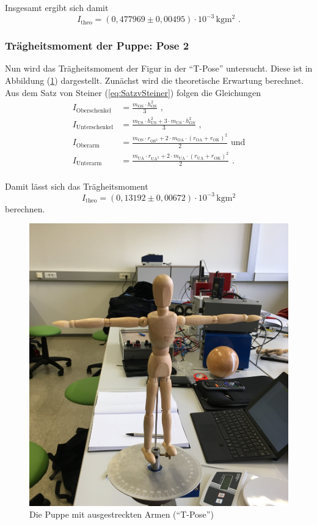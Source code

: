 Insgesamt ergibt sich damit
\begin{equation*}
  I_{\text{theo}} = (0,477969 \pm 0,00495) \cdot 10^{-3} \, \unit{\kilo\gram\meter\squared} \text{ .}
\end{equation*}

\subsubsection{Trägheitsmoment der Puppe: Pose 2}

Nun wird das Trägheitsmoment der Figur in der \enquote{T-Pose} untersucht.
Diese ist in Abbildung (\ref{fig:pose2}) dargestellt.
Zunächst wird die theoretische Erwartung berechnet.
Aus dem Satz von Steiner (\ref{eq:SatzvSteiner}) folgen die Gleichungen
\begin{align*}
I_{\text{Oberschenkel}} &= \frac{m_{\text{OS}} \cdot h_{\text{OS}}^2} {3} \text{ ,}\\
I_{\text{Unterschenkel}} &= \frac{m_{\text{US}} \cdot h_{\text{US}}^2 + 3 \cdot m_{US} \cdot h_{OS}^2} {3} \text{ ,}\\
I_{\text{Oberarm}} &= \frac{m_{\text{OS}} \cdot r_{\text{OS}^2} + 2 \cdot m_{\text{OA}} \cdot (r_{\text{OA}} + r_{\text{OK}})^2} {2} \text{ und}\\
I_{\text{Unterarm}} &= \frac{m_{\text{UA}} \cdot r_{\text{UA}^2} + 2 \cdot m_{\text{UA}} \cdot (r_{\text{UA}} + r_{\text{OK}})^2} {2} \text{ .}\\
\end{align*}

Damit lässt sich das Trägheitsmoment
\begin{equation*}
  I_{\text{theo}} = (0,13192 \pm 0,00672) \cdot 10^{-3} \, \unit{\kilo\gram\meter\squared}
\end{equation*}
berechnen.

\begin{figure}[H]
  \centering
  \includegraphics[width=0.3\columnwidth]{pictures/puppe_tpose.jpg}
  \caption{Die Puppe mit ausgestreckten Armen (\enquote{T-Pose})}
  \label{fig:pose2}
\end{figure}

